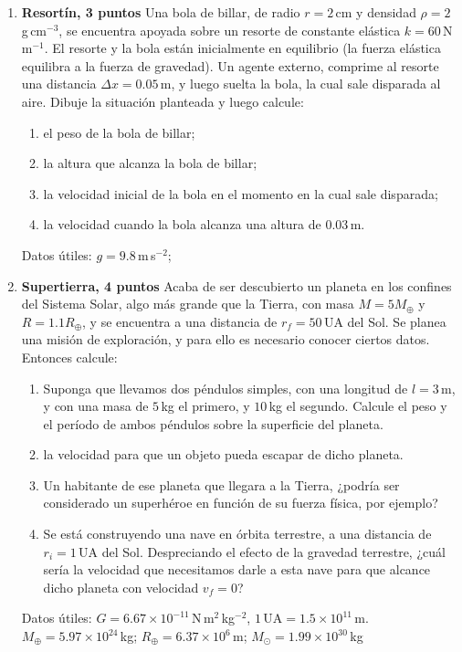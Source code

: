 \documentclass[a4paper,12pt]{article}
\begin{document}
\begin{enumerate}
	\item{\bf{Resortín, 3 puntos}}
		Una bola de billar, de radio $r=2$\,cm y densidad
		$\rho=2$\,g\,cm$^{-3}$, se encuentra apoyada sobre un resorte de
		constante elástica $k=60$\,N\,m$^{-1}$. El resorte y la bola están
		inicialmente en equilibrio (la fuerza elástica equilibra a la fuerza de
		gravedad). Un agente externo, comprime al resorte una distancia $\Delta
		x=0.05$\,m, y luego suelta la bola, la cual sale disparada al aire.
		Dibuje la situación planteada y luego calcule:
		\begin{enumerate}
			\item el peso de la bola de billar;
			\item la altura que alcanza la bola de billar;
			\item la velocidad inicial de la bola en el momento en la cual sale
				disparada;
			\item la velocidad cuando la bola alcanza una altura de $0.03$\,m.
		\end{enumerate}
		Datos útiles: $g = 9.8$\,m\,s$^{-2}$;

	\item{\bf{Supertierra, 4 puntos}}
		Acaba de ser descubierto un planeta en los confines del Sistema Solar,
		algo más grande que la Tierra, con masa $M=5 M_\oplus$ y $R=1.1
		R_\oplus$, y se encuentra a una distancia de $r_f=50$\,UA del Sol. Se
		planea una misión de exploración, y para ello es necesario conocer
		ciertos datos. Entonces calcule:
		\begin{enumerate}
			\item Suponga que llevamos dos péndulos simples, con una longitud
				de $l=3$\,m, y con una masa de $5$\,kg el primero, y $10$\,kg
				el segundo.  Calcule el peso y el período de ambos péndulos
				sobre la superficie del planeta.
			\item la velocidad para que un objeto pueda escapar de dicho
				planeta.
			\item Un habitante de ese planeta que llegara a la Tierra, ¿podría
				ser considerado un superhéroe en función de su fuerza física,
				por ejemplo?
			\item Se está construyendo una nave en órbita terrestre, a una
				distancia de $r_i=1$\,UA del Sol. Despreciando el efecto de la
				gravedad terrestre, ¿cuál sería la velocidad que necesitamos
				darle a esta nave para que alcance dicho planeta con velocidad
				$v_f=0$?
		\end{enumerate}
		Datos útiles: $G = 6.67 \times 10^{-11}$\,N\,m$^2$\,kg$^{-2}$, $1$\,UA$
		= 1.5\times 10^{11}$\,m.  $M_\oplus=5.97\times 10^{24}$\,kg;
		$R_\oplus=6.37\times 10^{6}$\,m; $M_\odot=1.99\times 10^{30}$\,kg
	

\end{enumerate}
\end{document}
